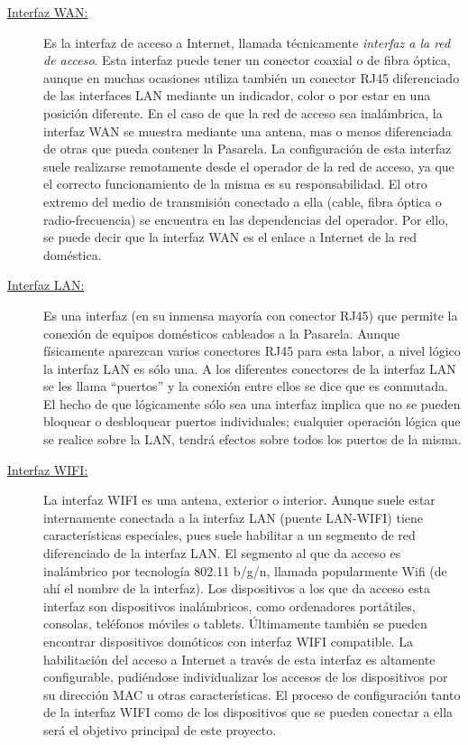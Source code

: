 \documentclass[12pt]{article}
\begin{document}
    \begin{description}
        \item[\underline{Interfaz WAN:}] Es la interfaz de acceso a Internet, llamada técnicamente \textit{interfaz a la red de acceso}. Esta interfaz puede tener un conector coaxial o de fibra óptica, aunque en muchas ocasiones utiliza también un conector RJ45 diferenciado de las interfaces LAN mediante un indicador, color o por estar en una posición diferente. En el caso de que la red de acceso sea inalámbrica, la interfaz WAN se muestra mediante una antena, mas o menos diferenciada de otras que pueda contener la Pasarela. La configuración de esta interfaz suele realizarse remotamente desde el operador de la red de acceso, ya que el correcto funcionamiento de la misma es su responsabilidad. El otro extremo del medio de transmisión conectado a ella (cable, fibra óptica o radio-frecuencia) se encuentra en las dependencias del operador. Por ello, se puede decir que la interfaz WAN es el enlace a Internet de la red doméstica.
        \item[\underline{Interfaz LAN:}] Es una interfaz (en su inmensa mayoría con conector RJ45) que permite la conexión de equipos domésticos cableados a la Pasarela. Aunque físicamente aparezcan varios conectores RJ45 para esta labor, a nivel lógico la interfaz LAN es sólo una. A los diferentes conectores de la interfaz LAN se les llama ``puertos'' y la conexión entre ellos se dice que es conmutada. El hecho de que lógicamente sólo sea una interfaz implica que no se pueden bloquear o desbloquear puertos individuales; cualquier operación lógica que se realice sobre la LAN, tendrá efectos sobre todos los puertos de la misma.
        \item[\underline{Interfaz WIFI:}] La interfaz WIFI es una antena, exterior o interior. Aunque suele estar internamente conectada a la interfaz LAN (puente LAN-WIFI) tiene características especiales, pues suele habilitar a un segmento de red diferenciado de la interfaz LAN. El segmento al que da acceso es inalámbrico por tecnología 802.11 b/g/n, llamada popularmente Wifi (de ahí el nombre de la interfaz). Los dispositivos a los que da acceso esta interfaz son dispositivos inalámbricos, como ordenadores portátiles, consolas, teléfonos móviles o tablets. Últimamente también se pueden encontrar dispositivos domóticos con interfaz WIFI compatible. La habilitación del acceso a Internet a través de esta interfaz es altamente configurable, pudiéndose individualizar los accesos de los dispositivos por su dirección MAC u otras características. El proceso de configuración tanto de la interfaz WIFI como de los dispositivos que se pueden conectar a ella será el objetivo principal de este proyecto.
    \end{description}
\end{document}

